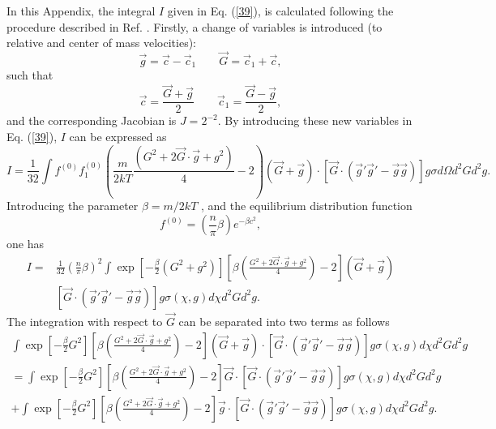 \documentclass[11pt]{article} %
\begin{document}
In this Appendix, the integral $I$ given in Eq.
(\ref{39}), is calculated following the procedure described in Ref.
\cite{Kremer}. Firstly, a change of variables is introduced (to relative
and center of mass velocities): 
\begin{equation}
\vec{g}=\vec{c}-\vec{c}_{1}\qquad\vec{G}=\vec{c}_{1}+\vec{c},\label{44}
\end{equation}
such that 
\begin{equation}
\vec{c}=\frac{\vec{G}+\vec{g}}{2}\qquad\vec{c}_{1}=\frac{\vec{G}-\vec{g}}{2},\label{45}
\end{equation}
and the corresponding Jacobian is $J=2^{-2}$. By introducing these new
variables in Eq. (\ref{39}), $I$ can be expressed as 
{\small
\begin{equation}
I=\frac{1}{32}\int f^{\left(0\right)}f_{1}^{\left(0\right)}\left(\frac{m}{2kT}\frac{\left(G^{2}+2\vec{G}\cdot\vec{g}+g^{2}\right)}{4}-2\right)\left(\vec{G}+\vec{g}\right)\cdot\left[\vec{G}\cdot\left(\vec{g}'\vec{g}'-\vec{g}\vec{g}\right)\right]g\sigma d\Omega d^{2}Gd^{2}g.\label{46}
\end{equation}}
Introducing the parameter $\beta=m/2kT$ , and the equilibrium distribution
function 
\begin{equation}
f^{\left(0\right)}=\left(\frac{n}{\pi}\beta\right)e^{-\beta c^{2}},\label{47}
\end{equation}
one has 
\begin{eqnarray}
I=& \frac{1}{32}\left(\frac{n}{\pi}\beta\right)^{2}\int\exp\left[-\frac{\beta}{2}\left(G^{2}+g^{2}\right)
\right]\left[\beta\left(\frac{G^{2}+2\vec{G}\cdot\vec{g}+g^{2}}{4}\right)-2\right]\left(\vec{G}+\vec{g}\right)\nonumber\\
 & \left[\vec{G}\cdot\left(\vec{g}'\vec{g}'-\vec{g}\vec{g}\right)\right]g\sigma\left(\chi,g\right)d\chi d^{2}Gd^{2}g.\label{48}
\end{eqnarray}
The integration with respect to $\vec{G}$ can be separated into two
terms as follows 
{\small
\begin{eqnarray}
\int\exp\left[-\frac{\beta}{2}G^{2}\right]\left[\beta\left(\frac{G^{2}+2\vec{G}\cdot\vec{g}+g^{2}}{4}\right)-2\right]\left(\vec{G}+\vec{g}\right)\cdot\left[\vec{G}\cdot\left(\vec{g}'\vec{g}'
-\vec{g}\vec{g}\right)\right]g\sigma\left(\chi,g\right)d\chi d^{2}Gd^{2}g \nonumber \\
=\int\exp\left[-\frac{\beta}{2}G^{2}\right]\left[\beta\left(\frac{G^{2}+2\vec{G}\cdot\vec{g}+g^{2}}{4}\right)-2\right]\vec{G}\cdot\left[\vec{G}\cdot\left(\vec{g}'\vec{g}'-\vec{g}\vec{g}\right)\right]g\sigma\left(\chi,g\right)d\chi d^{2}Gd^{2}g\label{49}\\
+\int\exp\left[-\frac{\beta}{2}G^{2}\right]\left[\beta\left(\frac{G^{2}+2\vec{G}\cdot\vec{g}+g^{2}}{4}\right)-2\right]\vec{g}\cdot\left[\vec{G}\cdot\left(\vec{g}'\vec{g}'-\vec{g}\vec{g}\right)\right]g\sigma\left(\chi,g\right)d\chi d^{2}Gd^{2}g.\nonumber 
\end{eqnarray}}
\end{document}
